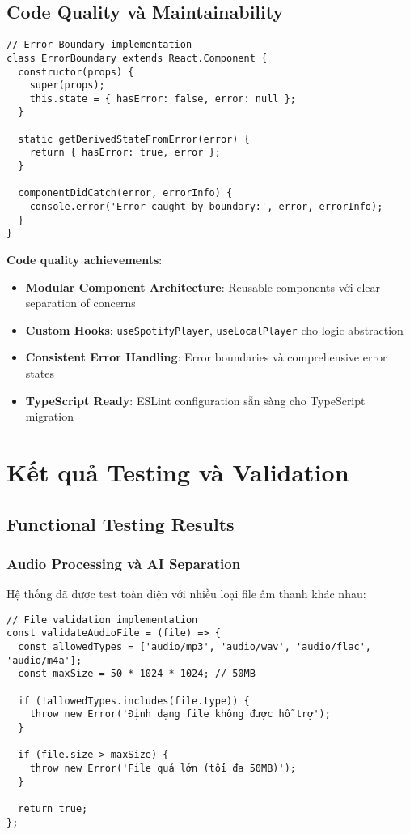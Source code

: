 \documentclass[12pt,a4paper]{article}
\begin{document}
\subsection{Code Quality và Maintainability}

\begin{lstlisting}[caption={Error Boundary implementation}]
// Error Boundary implementation
class ErrorBoundary extends React.Component {
  constructor(props) {
    super(props);
    this.state = { hasError: false, error: null };
  }
  
  static getDerivedStateFromError(error) {
    return { hasError: true, error };
  }
  
  componentDidCatch(error, errorInfo) {
    console.error('Error caught by boundary:', error, errorInfo);
  }
}
\end{lstlisting}

\textbf{Code quality achievements}:
\begin{itemize}
\item \textbf{Modular Component Architecture}: Reusable components với clear separation of concerns
\item \textbf{Custom Hooks}: \texttt{useSpotifyPlayer}, \texttt{useLocalPlayer} cho logic abstraction
\item \textbf{Consistent Error Handling}: Error boundaries và comprehensive error states
\item \textbf{TypeScript Ready}: ESLint configuration sẵn sàng cho TypeScript migration
\end{itemize}

\section{Kết quả Testing và Validation}

\subsection{Functional Testing Results}

\subsubsection{Audio Processing và AI Separation}

Hệ thống đã được test toàn diện với nhiều loại file âm thanh khác nhau:

\begin{lstlisting}[caption={File validation implementation}]
// File validation implementation
const validateAudioFile = (file) => {
  const allowedTypes = ['audio/mp3', 'audio/wav', 'audio/flac', 'audio/m4a'];
  const maxSize = 50 * 1024 * 1024; // 50MB
  
  if (!allowedTypes.includes(file.type)) {
    throw new Error('Định dạng file không được hỗ trợ');
  }
  
  if (file.size > maxSize) {
    throw new Error('File quá lớn (tối đa 50MB)');
  }
  
  return true;
};
\end{lstlisting}
\end{document}
